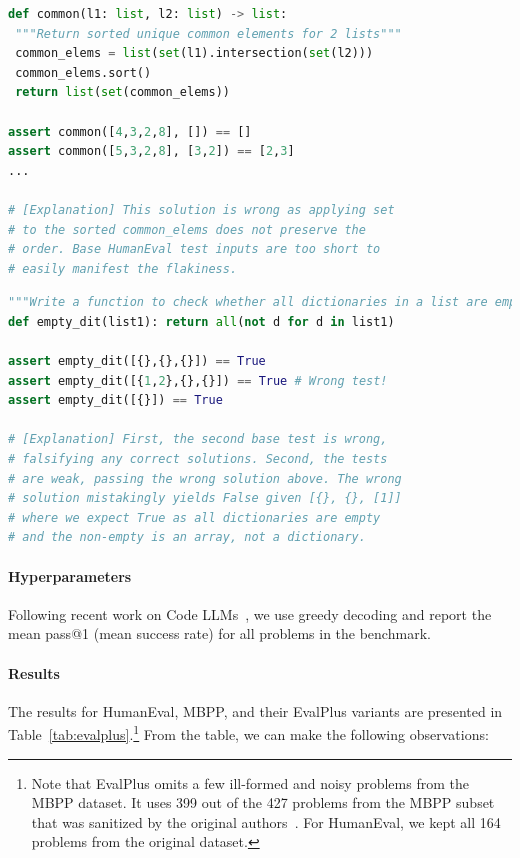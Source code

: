 \documentclass[10pt]{article} %
\begin{document}
\begin{minipage}{.48\textwidth}
\begin{lstlisting}[style=cruxeval,caption={A HumanEval task with insufficient tests},label={lst:evalp-desc}, captionpos=t, breaklines=true, language=Python]
def common(l1: list, l2: list) -> list:
 """Return sorted unique common elements for 2 lists"""
 common_elems = list(set(l1).intersection(set(l2)))
 common_elems.sort()
 return list(set(common_elems))

assert common([4,3,2,8], []) == []
assert common([5,3,2,8], [3,2]) == [2,3]
...

# [Explanation] This solution is wrong as applying set
# to the sorted common_elems does not preserve the 
# order. Base HumanEval test inputs are too short to
# easily manifest the flakiness.
\end{lstlisting}
\end{minipage}\hfill
\begin{minipage}{.48\textwidth}
\begin{lstlisting}[style=cruxeval,caption={An MBPP task with problematic tests},label={lst:evalp-test}, captionpos=t, breaklines=true, language=python]
"""Write a function to check whether all dictionaries in a list are empty or not."""
def empty_dit(list1): return all(not d for d in list1)

assert empty_dit([{},{},{}]) == True
assert empty_dit([{1,2},{},{}]) == True # Wrong test!
assert empty_dit([{}]) == True

# [Explanation] First, the second base test is wrong, 
# falsifying any correct solutions. Second, the tests 
# are weak, passing the wrong solution above. The wrong
# solution mistakingly yields False given [{}, {}, [1]]
# where we expect True as all dictionaries are empty
# and the non-empty is an array, not a dictionary. 
\end{lstlisting}
\end{minipage}



\paragraph{Hyperparameters} Following recent work on Code LLMs~\citep{roziere2023code, guo2024deepseek}, we use greedy decoding and report the mean pass@1 (mean success rate) for all problems in the benchmark.

\paragraph{Results} The results for HumanEval, MBPP, and their EvalPlus variants are presented in Table~\ref{tab:evalplus}.\footnote{Note that EvalPlus omits a few ill-formed and noisy problems from the MBPP dataset. It uses 399 out of the 427 problems from the  MBPP subset that was sanitized by the original authors~\citep{austin:mbpp}. For HumanEval, we kept all 164 problems from the original dataset.} From the table, we can make the following observations:
\end{document}
